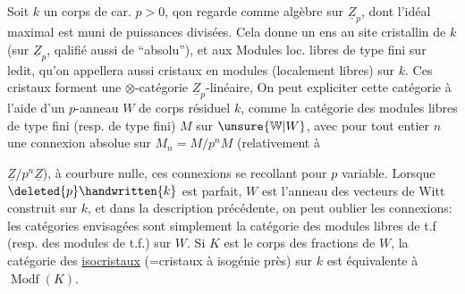  Soit $k$ un corps de car. $p>0$, qon regarde comme algèbre sur $\underline{Z}_p$, dont l'idéal maximal est muni de puissances divisées. Cela donne un ens au site cristallin de $k$ (sur $\underline{Z}_p$, qalifié aussi de ``absolu''), et aux Modules loc. libres de type fini sur ledit, qu'on appellera aussi cristaux en modules (localement libres) sur $k$. Ces cristaux forment une $\otimes$-catégorie $\underline{Z}_p$-linéaire,  On peut expliciter cette catégorie à l'aide d'un $p$-anneau $W$ de corps résiduel $k$, comme la catégorie des modules libres de type fini (resp. de type fini) $M$ sur $\unsure{\mathbb{W}|W}$, avec pour tout entier $n$ une connexion absolue sur $M_n=M/p^nM$ (relativement à  $\underline{Z}/p^n\underline{Z}$), à courbure nulle, ces connexions se recollant pour $p$ variable. Lorsque $\deleted{p}\handwritten{k}$ est parfait, $W$ est l'anneau des vecteurs de Witt construit sur $k$, et dans la description précédente, on peut oublier les connexions: les catégories envisagées sont simplement la catégorie des modules libres de t.f (resp. des modules de t.f.) sur $W$. Si $K$ est le corps des fractions de $W$, la catégorie des \uline{isocristaux}  (=cristaux à isogénie près) sur $k$ est équivalente à $\operatorname{Modf}(K)$. 

